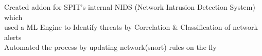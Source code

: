 \documentclass[]{deedy-resume-openfont}
\begin{document}
\begin{minipage}[t]{0.66\textwidth}
\vspace{2mm}
\small {
\hspace{2mm}  \textbullet{} Created addon for SPIT's internal NIDS (Network Intrusion Detection System) which\\
\hspace{5mm} used a ML Engine to Identify threats by Correlation \& Classification of network alerts\\
\hspace{2mm}  \textbullet{} Automated the process by updating network(snort) rules on the fly\\
}
\sectionsep





\end{minipage}
\end{document}

